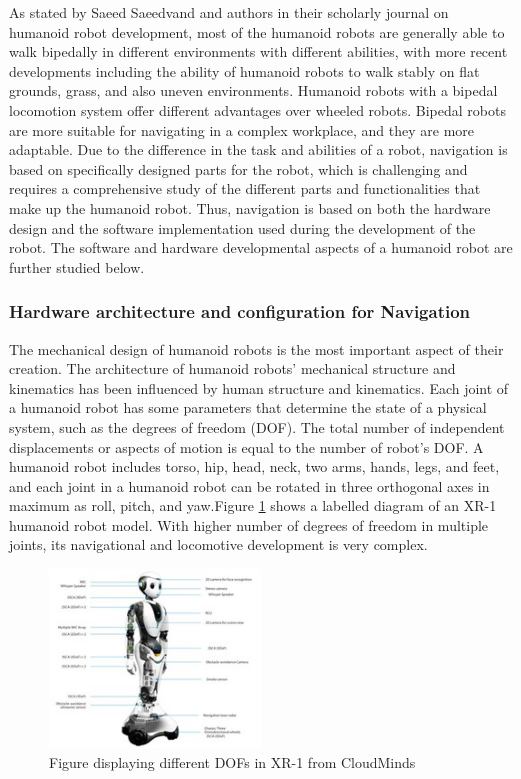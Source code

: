 \documentclass[conference]{IEEEtran}
\begin{document}
As stated by Saeed Saeedvand and authors in their scholarly journal on humanoid robot development, most of the humanoid robots are generally able to walk bipedally in different environments with different abilities, with more recent developments including the ability of humanoid robots to walk stably on flat grounds, grass, and also uneven environments\autocite{5saeedvand2019comprehensive}. Humanoid robots with a bipedal locomotion system offer different advantages over wheeled robots. Bipedal robots are more suitable for navigating in a complex workplace, and they are more adaptable\autocite{6silva2007historical}\autocite{6al2014modeling}. Due to the difference in the task and abilities of a robot, navigation is based on specifically designed parts for the robot, which is challenging and requires a comprehensive study of the different parts and functionalities that make up the humanoid robot. Thus, navigation is based on both the hardware design and the software implementation used during the development of the robot. The software and hardware developmental aspects of a humanoid robot are further studied below.

\subsubsection{Hardware architecture and configuration for Navigation}
The mechanical design of humanoid robots is the most important aspect of their creation. The architecture of humanoid robots' mechanical structure and kinematics has been influenced by human structure and kinematics.
Each joint of a humanoid robot has some parameters that determine the state of a physical system, such as the degrees of freedom (DOF). The total number of independent displacements or aspects of motion is equal to the number of robot’s DOF. A humanoid robot includes torso, hip, head, neck, two arms, hands, legs, and feet, and each joint in a humanoid robot can be rotated in three orthogonal axes in maximum as roll, pitch, and yaw\autocite{5saeedvand2019comprehensive}.Figure \ref{prerakfig4} shows a labelled diagram of an XR-1 humanoid robot model. With higher number of degrees of freedom in multiple joints, its navigational and locomotive development is very complex.

\begin{figure}[h]
    \centerline{\includegraphics[width=0.5\textwidth]{prerak_images/Picture4.jpg}}
    \caption{Figure displaying different DOFs in XR-1 from CloudMinds\autocite{4demaitre_demaitre_2020}}
\label{prerakfig4}
\end{figure}
\end{document}
